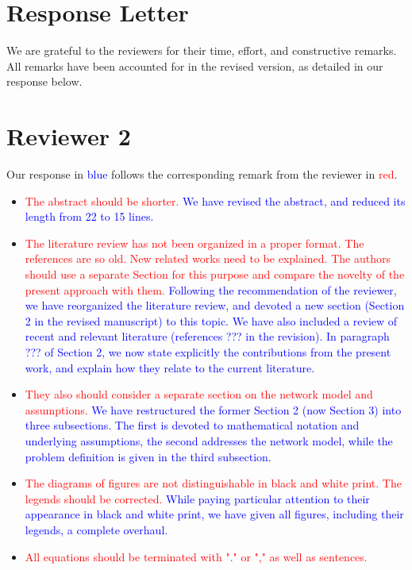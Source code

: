 \documentclass[12pt]{article}
\begin{document}
\section*{Response Letter}
We are grateful to the reviewers for their time, effort, and constructive remarks.
All remarks have been accounted for in the revised version, as detailed in our response below.

\section*{Reviewer 2}
Our response in \textcolor{blue}{blue} follows the corresponding remark from the reviewer in \textcolor{red}{red}.

\begin{itemize}
\item \textcolor{red}{The abstract should be shorter.} \textcolor{blue}{
We have revised the abstract, and reduced its length from 22 to 15 lines.
}
\item \textcolor{red}{The literature review has not been organized in a proper format. The references are so old. New related works need to be explained. The authors should use a separate Section for this purpose and compare the novelty of the present approach with them.} \textcolor{blue}{
Following the recommendation of the reviewer, we have reorganized the literature review, and devoted a new section (Section 2 in the revised manuscript)
to this topic. We have also included a review of recent and relevant literature (references ??? in the revision).
In paragraph ??? of Section 2, we now state explicitly the contributions from the present work, and explain how they relate to the current literature.
}
\item \textcolor{red}{They also should consider a separate section on the network model and assumptions.} \textcolor{blue}{
We have restructured the former Section 2 (now Section 3) into three subsections.
The first is devoted to mathematical notation and underlying assumptions, the second addresses the network model,
while the problem definition is given in the third subsection.
}
\item \textcolor{red}{The diagrams of figures are not distinguishable in black and white print. The legends should be corrected.} \textcolor{blue}{
While paying particular attention to their appearance in black and white print, we have given all figures,
including their legends, a complete overhaul.
}
\item \textcolor{red}{All equations should be terminated with "." or "," as well as sentences.} \textcolor{blue}{
}
\end{itemize}
\end{document}
